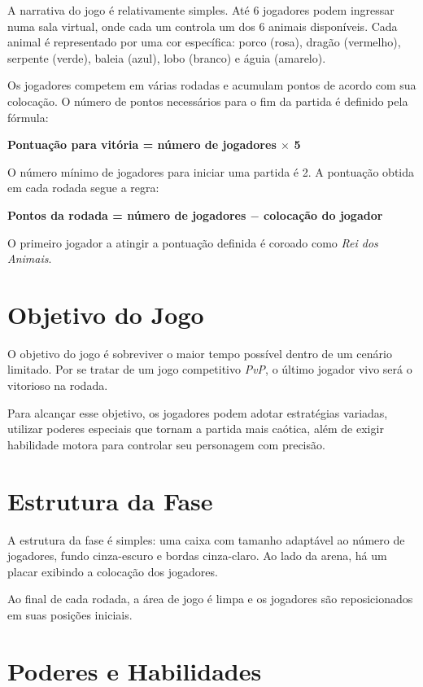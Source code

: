 A narrativa do jogo é relativamente simples. Até 6 jogadores podem ingressar numa sala virtual, onde cada um controla um dos 6 animais disponíveis. Cada animal é representado por uma cor específica: porco (rosa), dragão (vermelho), serpente (verde), baleia (azul), lobo (branco) e águia (amarelo).

Os jogadores competem em várias rodadas e acumulam pontos de acordo com sua colocação. O número de pontos necessários para o fim da partida é definido pela fórmula:

\begin{center}
    \textbf{Pontuação para vitória = número de jogadores $\times$ 5}
\end{center}

O número mínimo de jogadores para iniciar uma partida é 2. A pontuação obtida em cada rodada segue a regra:

\begin{center}
    \textbf{Pontos da rodada = número de jogadores $-$ colocação do jogador}
\end{center}

O primeiro jogador a atingir a pontuação definida é coroado como \textit{Rei dos Animais}.

\section{Objetivo do Jogo}

O objetivo do jogo é sobreviver o maior tempo possível dentro de um cenário limitado. Por se tratar de um jogo competitivo \textit{PvP}, o último jogador vivo será o vitorioso na rodada.

Para alcançar esse objetivo, os jogadores podem adotar estratégias variadas, utilizar poderes especiais que tornam a partida mais caótica, além de exigir habilidade motora para controlar seu personagem com precisão.

\section{Estrutura da Fase}

A estrutura da fase é simples: uma caixa com tamanho adaptável ao número de jogadores, fundo cinza-escuro e bordas cinza-claro. Ao lado da arena, há um placar exibindo a colocação dos jogadores.

Ao final de cada rodada, a área de jogo é limpa e os jogadores são reposicionados em suas posições iniciais.

\section{Poderes e Habilidades}

